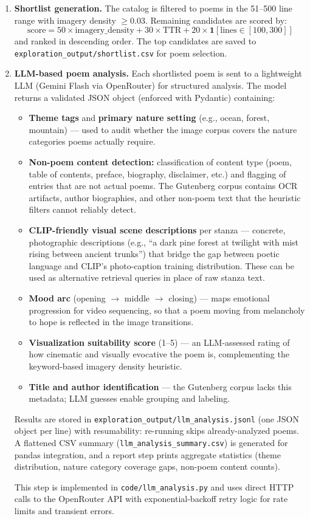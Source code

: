 \documentclass[11pt,a4paper]{article}
\begin{document}
\begin{enumerate}
  \item \textbf{Shortlist generation.} The catalog is filtered to poems in the 51--500 line range with imagery density $\geq 0.03$. Remaining candidates are scored by:
  \[
    \text{score} = 50 \times \text{imagery\_density} + 30 \times \text{TTR} + 20 \times \mathbf{1}[\text{lines} \in [100, 300]]
  \]
  and ranked in descending order. The top candidates are saved to \texttt{exploration\_output/shortlist.csv} for poem selection.

  \item \textbf{LLM-based poem analysis.} Each shortlisted poem is sent to a lightweight LLM (Gemini Flash via OpenRouter) for structured analysis. The model returns a validated JSON object (enforced with Pydantic) containing:
  \begin{itemize}
    \item \textbf{Theme tags} and \textbf{primary nature setting} (e.g., ocean, forest, mountain) — used to audit whether the image corpus covers the nature categories poems actually require.
    \item \textbf{Non-poem content detection:} classification of content type (poem, table of contents, preface, biography, disclaimer, etc.) and flagging of entries that are not actual poems. The Gutenberg corpus contains OCR artifacts, author biographies, and other non-poem text that the heuristic filters cannot reliably detect.
    \item \textbf{CLIP-friendly visual scene descriptions} per stanza — concrete, photographic descriptions (e.g., ``a dark pine forest at twilight with mist rising between ancient trunks'') that bridge the gap between poetic language and CLIP's photo-caption training distribution. These can be used as alternative retrieval queries in place of raw stanza text.
    \item \textbf{Mood arc} (opening $\rightarrow$ middle $\rightarrow$ closing) — maps emotional progression for video sequencing, so that a poem moving from melancholy to hope is reflected in the image transitions.
    \item \textbf{Visualization suitability score} (1--5) — an LLM-assessed rating of how cinematic and visually evocative the poem is, complementing the keyword-based imagery density heuristic.
    \item \textbf{Title and author identification} — the Gutenberg corpus lacks this metadata; LLM guesses enable grouping and labeling.
  \end{itemize}

  Results are stored in \texttt{exploration\_output/llm\_analysis.jsonl} (one JSON object per line) with resumability: re-running skips already-analyzed poems. A flattened CSV summary (\texttt{llm\_analysis\_summary.csv}) is generated for pandas integration, and a report step prints aggregate statistics (theme distribution, nature category coverage gaps, non-poem content counts).

  This step is implemented in \texttt{code/llm\_analysis.py} and uses direct HTTP calls to the OpenRouter API with exponential-backoff retry logic for rate limits and transient errors.
\end{enumerate}
\end{document}
